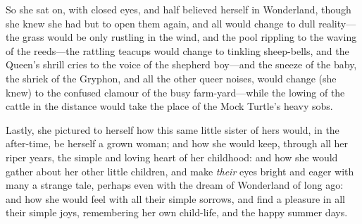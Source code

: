 \documentclass[12pt,openany]{memoir}
\begin{document}
So she sat on, with closed eyes, and half believed herself in Wonderland, though she knew she had but to open them again, and all would change to dull reality---the grass would be only rustling in the wind, and the pool rippling to the waving of the reeds---the rattling teacups would change to tinkling sheep-bells, and the Queen's shrill cries to the voice of the shepherd boy---and the sneeze of the baby, the shriek of the Gryphon, and all the other queer noises, would change (she knew) to the confused clamour of the busy farm-yard---while the lowing of the cattle in the distance would take the place of the Mock Turtle's heavy sobs.

Lastly, she pictured to herself how this same little sister of hers would, in the after-time, be herself a grown woman; and how she would keep, through all her riper years, the simple and loving heart of her childhood: and how she would gather about her other little children, and make \textit{their} eyes bright and eager with many a strange tale, perhaps even with the dream of Wonderland of long ago: and how she would feel with all their simple sorrows, and find a pleasure in all their simple joys, remembering her own child-life, and the happy summer days.


\newpage\null\thispagestyle{empty}\newpage
\end{document}
